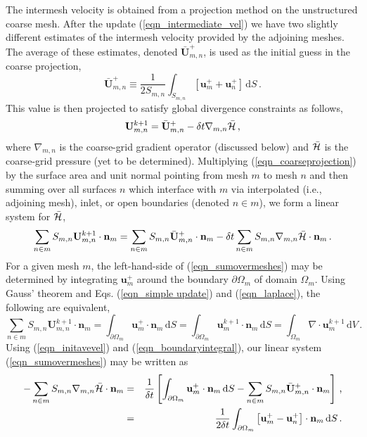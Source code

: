 \documentclass[11pt]{book}
\begin{document}
The intermesh velocity is obtained from a projection method on the unstructured coarse mesh.  After the update (\ref{eqn_intermediate_vel}) we have two slightly different estimates of the intermesh velocity provided by the adjoining meshes.  The average of these estimates, denoted $\bar{\mathbf{U}}^+_{m,n}$, is used as the initial guess in the coarse projection,
\begin{equation}
\label{eqn_initavevel}
\bar{\mathbf{U}}^+_{m,n} \equiv \frac{1}{2 S_{m,n}} \int_{S_{m,n}} \left[\mathbf{u}_{m}^+ + \mathbf{u}_{n}^+ \right] \,\mbox{d} S \,\mbox{.}
\end{equation}
This value is then projected to satisfy global divergence constraints as follows,
\begin{equation}
\label{eqn_coarseprojection}
\mathbf{U}^{k+1}_{m,n} = \bar{\mathbf{U}}^+_{m,n} - \delta t \nabla_{m,n}\bar{{\cal H}} \,\mbox{,}
\end{equation}
where $\nabla_{m,n}$ is the coarse-grid gradient operator (discussed below) and $\bar{{\cal H}}$ is the coarse-grid pressure (yet to be determined). Multiplying (\ref{eqn_coarseprojection}) by the surface area and unit normal pointing from mesh $m$ to mesh $n$ and then summing over all surfaces $n$ which interface with $m$ via interpolated (i.e., adjoining mesh), inlet, or open boundaries (denoted $n \in m$), we form a linear system for $\bar{{\cal H}}$,
\begin{equation}
\label{eqn_sumovermeshes}
\sum_{n\in m} S_{m,n} \mathbf{U}^{k+1}_{m,n} \cdot \mathbf{n}_{m} = \sum_{n\in m} S_{m,n} \bar{\mathbf{U}}^+_{m,n} \cdot \mathbf{n}_{m} - \delta t \sum_{n\in m} S_{m,n} \nabla_{m,n}\bar{{\cal H}} \cdot \mathbf{n}_{m} \,\mbox{.}
\end{equation}
For a given mesh $m$, the left-hand-side of (\ref{eqn_sumovermeshes}) may be determined by integrating $\mathbf{u}^+_{m}$ around the boundary $\partial \Omega_{m}$ of domain $\Omega_m$.  Using Gauss' theorem and Eqs. (\ref{eqn_simple update}) and (\ref{eqn_laplace}), the following are equivalent,
\begin{equation}
\label{eqn_boundaryintegral}
\sum_{n\in m} S_{m,n} \mathbf{U}^{k+1}_{m,n} \cdot \mathbf{n}_{m} = \int_{\partial \Omega_{m}}\mathbf{u}^+_{m} \cdot \mathbf{n}_m \,\mbox{d}S  = \int_{\partial \Omega_{m}}\mathbf{u}^{k+1}_{m} \cdot \mathbf{n}_m \,\mbox{d}S = \int_{\Omega_{m}} \nabla\cdot\mathbf{u}^{k+1}_{m} \,\mbox{d}V \,\mbox{.}
\end{equation}
Using (\ref{eqn_initavevel}) and (\ref{eqn_boundaryintegral}), our linear system (\ref{eqn_sumovermeshes}) may be written as
\begin{eqnarray}
\label{eqn_linsystem1}
- \sum_{n\in m} S_{m,n} \nabla_{m,n}\bar{{\cal H}} \cdot \mathbf{n}_{m} &=& \frac{1}{\delta t} \left[ \int_{\partial \Omega_{m}}\mathbf{u}^+_{m} \cdot \mathbf{n}_m \,\mbox{d}S - \sum_{n\in m} S_{m,n} \bar{\mathbf{U}}^+_{m,n} \cdot \mathbf{n}_{m} \right] \,\mbox{,} \\
\label{eqn_linsystem2}
&=& \frac{1}{2 \delta t} \int_{\partial \Omega_{m}} \left[ \mathbf{u}^+_m - \mathbf{u}^+_n \right] \cdot \mathbf{n}_{m} \,\mbox{d}S \,\mbox{.}
\end{eqnarray}
\end{document}
